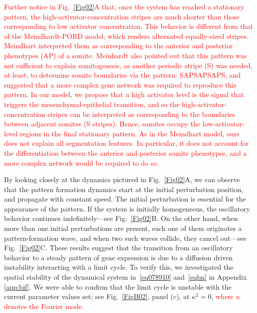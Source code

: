 \documentclass[%
 preprint,
 aip, 
 amsmath,amssymb,
]{revtex4-2}
\begin{document}
\textcolor{red}{Further notice in Fig.~\ref{Fig02}A that, once the system has reached a stationary pattern, the high-activator-concentration stripes are much shorter than those corresponding to low activator concentration. This behavior is different from that of the Meindhardt-PORD model, which renders alternated equally-sized stripes. Meindhart interpreted them as corresponding to the anterior and posterior phenotypes (AP) of a somite. Meinhardt also pointed out that this pattern was not sufficient to explain somitogenesis, as another periodic stripe (S) was needed, at least, to determine somite boundaries via the pattern: SAPSAPSAPS, and suggested that a more complex gene network was required to reproduce this pattern. In our model, we propose that a high activator level is the signal that triggers the mesenchymal-epithelial transition, and so the high-activator-concentration stripes can be interpreted as corresponding to the boundaries between adjacent somites (S stripes). Hence, somites occupy the low-activator-level regions in the final stationary pattern. As in the Meindhart model, ours does not explain all segmentation features. In particular, it does not account for the differentiation between the anterior and posterior somite phenotypes, and a more complex network would be required to do so.}

By looking closely at the dynamics pictured in Fig.~\ref{Fig02}A, we can observe that the pattern formation dynamics start at the initial perturbation position, and propagate with constant speed. The initial perturbation is essential for the appearance of the pattern. If the system is initially homogeneous, the oscillatory behavior continues indefinitely---see Fig.~\ref{Fig02}B. On the other hand, when more than one initial perturbations are present, each one of them originates a pattern-formation wave, and when two such waves collide, they cancel out---see Fig.~\ref{Fig02}C. These results suggest that the transition from an oscillatory behavior to a steady pattern of gene expression is due to a diffusion driven instability interacting with a limit cycle. To verify this, we investigated the spatial stability of the dynamical system in~\eqref{eq078910} and~\eqref{eqbn} in Appendix \ref{app:bif}. We were able to confirm that the limit cycle is unstable with the current parameter values set; see Fig.~\ref{FigB02}, panel (c), at $\kappa^2=0$, \textcolor{red}{where $\kappa$ denotes the Fourier mode.}
	
\end{document}
